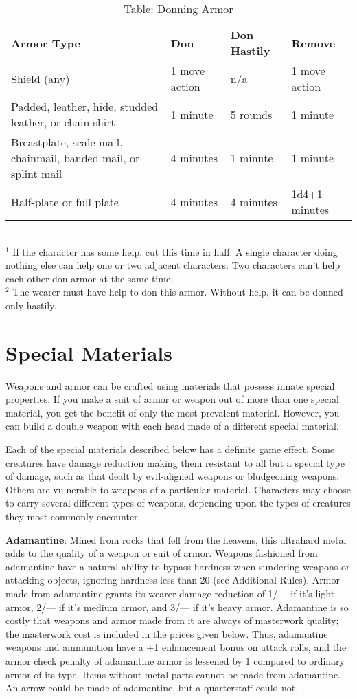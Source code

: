 \begin{table*}[]
\sffamily
\caption{Table: Donning Armor}
\begin{tabular}{llll}
\textbf{Armor Type} & \textbf{Don} & \textbf{Don Hastily} & \textbf{Remove}\\
Shield (any) & 1 move action &  n/a & 1 move action \\
Padded, leather, hide, studded leather, or chain shirt & 1 minute & 5 rounds & 1 minute \\
Breastplate, scale mail, chainmail, banded mail, or splint mail & 4 minutes & 1 minute & 1 minute \\
Half-plate or full plate & 4 minutes & 4 minutes & 1d4+1 minutes\\
\end{tabular}\\
\(^{1}\) If the character has some help, cut this time in half. A single character doing nothing else can help one or two adjacent characters. Two characters can't help each other don armor at the same time.\\
\(^{2}\) The wearer must have help to don this armor. Without help, it can be donned only hastily.\\
\end{table*}

\section{Special Materials}
	
Weapons and armor can be crafted using materials that possess innate special properties. If you make a suit of armor or weapon out of more than one special material, you get the benefit of only the most prevalent material. However, you can build a double weapon with each head made of a different special material. 
	
Each of the special materials described below has a definite game effect. Some creatures have damage reduction making them resistant to all but a special type of damage, such as that dealt by evil-aligned weapons or bludgeoning weapons. Others are vulnerable to weapons of a particular material. Characters may choose to carry several different types of weapons, depending upon the types of creatures they most commonly encounter. 
	
\textbf{Adamantine}: Mined from rocks that fell from the heavens, this ultrahard metal adds to the quality of a weapon or suit of armor. Weapons fashioned from adamantine have a natural ability to bypass hardness when sundering weapons or attacking objects, ignoring hardness less than 20 (see Additional Rules). Armor made from adamantine grants its wearer damage reduction of 1/--- if it's light armor, 2/--- if it's medium armor, and 3/--- if it's heavy armor. Adamantine is so costly that weapons and armor made from it are always of masterwork quality; the masterwork cost is included in the prices given below. Thus, adamantine weapons and ammunition have a +1 enhancement bonus on attack rolls, and the armor check penalty of adamantine armor is lessened by 1 compared to ordinary armor of its type. Items without metal parts cannot be made from adamantine. An arrow could be made of adamantine, but a quarterstaff could not.
	
